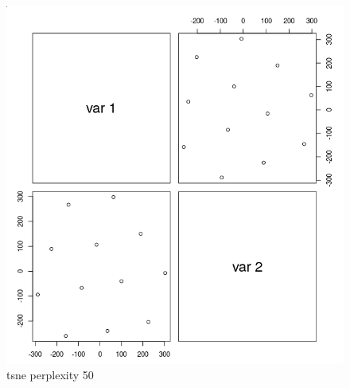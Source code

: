 \documentclass{report}
\begin{document}
\begin{figure}[H]
  \includegraphics[width=\linewidth]{tsne_p_50.png}
  \caption{tsne perplexity 50}
  \label{fig:tsnep50}
\end{figure}
\end{document}
